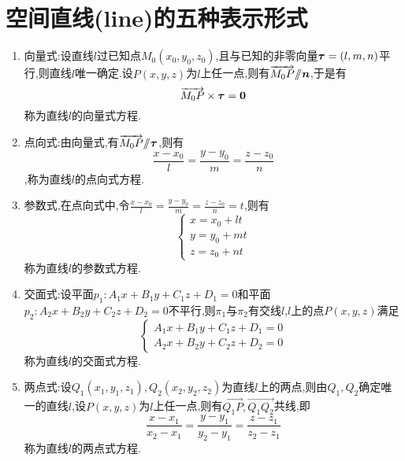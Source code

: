 \section{空间直线(line)的五种表示形式}
\begin{definition}[空间直线的五种表示形式]
    \begin{enumerate}
        \item 向量式:设直线$l$过已知点$M_0(x_0,y_0,z_0)$,且与已知的非零向量$\bm{\tau}=(l,m,n)$平行,则直线$l$唯一确定.设$P(x,y,z)$为$l$上任一点,则有$\overrightarrow{M_0P}/\!\!/\bm{n}$,于是有$$\overrightarrow{M_0P}\times\bm{\tau}=\bm{0}$$称为直线$l$的向量式方程.
        \item 点向式:由向量式,有$\overrightarrow{M_0P}/\!\!/\bm{\tau}$,则有$$\frac{x-x_0}{l}=\frac{y-y_0}{m}=\frac{z-z_0}{n}$$,称为直线$l$的点向式方程.
        \item 参数式,在点向式中,令$\frac{x-x_0}{l}=\frac{y-y_0}{m}=\frac{z-z_0}{n}=t$,则有$$\begin{cases}x=x_0+lt\\y=y_0+mt\\z=z_0+nt\end{cases}$$称为直线$l$的参数式方程.
        \item 交面式:设平面$p_1:A_1x+B_1y+C_1z+D_1=0$和平面$p_2:A_2x+B_2y+C_2z+D_2=0$不平行,则$\pi_1$与$\pi_2$有交线$l$,$l$上的点$P(x,y,z)$满足$$\begin{cases}A_1x+B_1y+C_1z+D_1=0\\A_2x+B_2y+C_2z+D_2=0\end{cases}$$称为直线$l$的交面式方程.
        \item 两点式:设$Q_1(x_1,y_1,z_1),Q_2(x_2,y_2,z_2)$为直线$l$上的两点,则由$Q_1,Q_2$确定唯一的直线$l$,设$P(x,y,z)$为$l$上任一点,则有$\overrightarrow{Q_1P},\overrightarrow{Q_1Q_2}$共线,即$$\frac{x-x_1}{x_2-x_1}=\frac{y-y_1}{y_2-y_1}=\frac{z-z_1}{z_2-z_1}$$称为直线$l$的两点式方程.   
    \end{enumerate}
\end{definition}
\newpage
